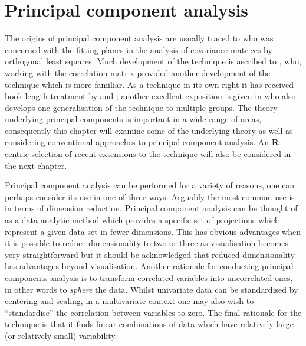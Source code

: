 \chapter{Principal component analysis}
\label{pca}


The origins of principal component analysis are usually traced to \cite{Pearson:1901} who was concerned with the fitting planes in the analysis of covariance matrices by orthogonal least squares.   Much development of the technique is ascribed to \cite{Hotelling:1933}, who, working with the correlation matrix provided another development of the technique which is more familiar.    As a technique in its own right it has received book length treatment by \cite{Jackson:1991} and \cite{Jolliffe:1986}; another excellent exposition is given in \cite{Flury:1988} who also develops one generalisation of the technique to multiple groups.   The theory underlying principal components is important in a wide range of areas, consequently this chapter will examine some of the underlying theory as well as considering conventional approaches to principal component analysis.   An \textbf{R}-centric selection of recent extensions to the technique will also be considered in the next chapter.

Principal component analysis can be performed for a variety of reasons, one can perhaps consider its use in one of three ways.   Arguably the most common use is in terms of dimension reduction.   Principal component analysis can be thought of as a data analytic method which provides a specific set of projections which represent a given data set in fewer dimensions.   This has obvious advantages when it is possible to reduce dimensionality to two or three as visualisation becomes very straightforward but it should be acknowledged that reduced dimensionality has advantages beyond visualisation.  Another rationale for conducting principal components analysis is to transform correlated variables into uncorrelated ones, in other words to \emph{sphere} the data.   Whilst univariate data can be standardised by centering and scaling, in a multivariate context one may also wish to ``standardise'' the correlation between variables to zero.    The final rationale for the technique is that it finds linear combinations of data which have relatively large (or relatively small) variability.



